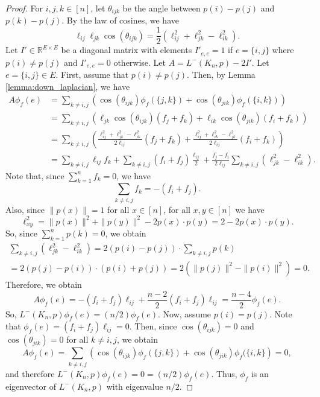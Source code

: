 \documentclass[a4paper,11pt]{article}
\theoremstyle{plain}
\theoremstyle{definition}
\newcommand{\Rea}{{\mathbb R}}
\begin{document}
\begin{proof}
For $i,j,k\in[n]$, let $\theta_{ijk}$ be the angle between $p(i)-p(j)$ and $p(k)-p(j)$.
By the law of cosines, we have
\[
    \ell_{ij}\ell_{jk}\cos(\theta_{ijk})=\frac{1}{2}\left(\ell_{ij}^2+\ell_{jk}^2-\ell_{ik}^2\right).
\]
Let $I'\in \Rea^{E\times E}$ be a diagonal matrix with elements $I'_{e,e}=1$ if $e=\{i,j\}$ where $p(i)\neq p(j)$ and $I'_{e,e}=0$ otherwise.
Let $A=L^{-}(K_n,p)-2I'$.
Let $e=\{i,j\}\in E$. First, assume that $p(i)\neq p(j)$.
Then, by Lemma \ref{lemma:down_laplacian}, we have
\begin{align*}
A \phi_f(e)&= \sum_{k\neq i,j} \left(\cos(\theta_{ijk}) \phi_f(\{j,k\}) +\cos(\theta_{jik})\phi_f(\{i,k\})\right)
\\
&=\sum_{k\neq i,j} \left(\ell_{jk}\cos(\theta_{ijk})(f_j+f_k)  +\ell_{ik}\cos(\theta_{jik})(f_i+f_k)\right)
\\
&=\sum_{k\neq i,j} \left(\frac{\ell_{ij}^2+\ell_{jk}^2-\ell_{ik}^2}{2\ell_{ij}}(f_j+f_k)  +\frac{\ell_{ij}^2+\ell_{ik}^2-\ell_{jk}^2}{2\ell_{ij}}(f_i+f_k)\right)
\\
&=\sum_{k\neq i,j} \ell_{ij} f_k
+ \sum_{k\neq i,j} (f_i+f_j)\frac{\ell_{ij}}{2} +\frac{f_j-f_i}{2\ell_{ij}} \sum_{k\neq i,j}(\ell_{jk}^2-\ell_{ik}^2).
\end{align*}
Note that, since $\sum_{k=1}^n f_k=0$, we have
\[
    \sum_{k\neq i,j} f_k = -(f_i+f_j).
\]
Also, since $\|p(x)\|=1$ for all $x\in[n]$, for all $x,y\in[n]$ we have
\[
    \ell_{xy}^2= \|p(x)\|^2+\|p(y)\|^2-2 p(x)\cdot p(y)= 2-2 p(x)\cdot p(y).
\]
So, since $\sum_{k=1}^n p(k)=0$, we obtain
\begin{multline*}
    \sum_{k\neq i,j} (\ell_{jk}^2-\ell_{ik}^2) = 2(p(i)-p(j))\cdot\sum_{k\neq i,j} p(k)
    \\
    = 2(p(j)-p(i))\cdot(p(i)+p(j))= 2(\|p(j)\|^2-\|p(i)\|^2)=0.
\end{multline*}
Therefore, we obtain
\[
A \phi_f(e)= -(f_i+f_j)\ell_{ij}+\frac{n-2}{2}(f_i+f_j) \ell_{ij}= \frac{n-4}{2} \phi_f(e).
\]
So, $L^{-}(K_n,p)\phi_{f}(e)=(n/2)\phi_f(e)$.
Now, assume $p(i)=p(j)$. Note that $\phi_f(e)=(f_i+f_j)\ell_{i j}=0$. Then, since $\cos(\theta_{i j k})=0$ and $\cos(\theta_{j i k})=0$ for all $k\neq i,j$, we obtain
\[
A \phi_f(e)= \sum_{k\neq i,j} \left(\cos(\theta_{ijk}) \phi_f(\{j,k\}) +\cos(\theta_{jik})\phi_f(\{i,k\}\right)=0,
\]
and therefore $L^{-}(K_n,p)\phi_{f}(e)=0=(n/2)\phi_f(e)$.
Thus, $\phi_f$ is an eigenvector of $L^{-}(K_n,p)$ with eigenvalue $n/2$.


\end{proof}
\end{document}
